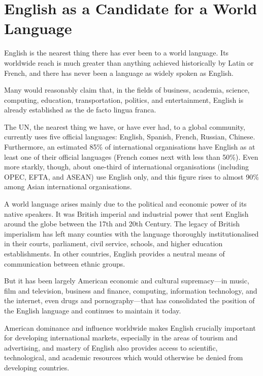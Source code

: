 \documentclass[../main.tex]{subfiles}
\begin{document}
    \section{English as a Candidate for a World Language}
        English is the nearest thing there has ever been to a world language. Its worldwide reach is much greater than anything achieved historically by Latin or French, and there has never been a language as widely spoken as English. \par 
        Many would reasonably claim that, in the fields of business, academia, science, computing, education, transportation, politics, and entertainment, English is already established as the de facto lingua franca. \par 
        The UN, the nearest thing we have, or have ever had, to a global community, currently uses five official languages: English, Spanish, French, Russian, Chinese. Furthermore, an estimated 85\% of international organisations have English as at least one of their official languages (French comes next with less than 50\%). Even more starkly, though, about one-third of international organisations (including OPEC, EFTA, and ASEAN) use English only, and this figure rises to almost 90\% among Asian international organisations.  \par 
        A world language arises mainly due to the political and economic power of its native speakers. It was British imperial and industrial power that sent English around the globe between the 17th and 20th Century. The legacy of British imperialism has left many counties with the language thoroughly institutionalised in their courts, parliament, civil service, schools, and higher education establishments. In other countries, English provides a neutral means of communication between ethnic groups. \par
        But it has been largely American economic and cultural supremacy---in music, film and television, business and finance, computing, information technology, and the internet, even drugs and pornography---that has consolidated the position of the English language and continues to maintain it today. \par 
        American dominance and influence worldwide makes English crucially important for developing international markets, especially in the areas of tourism and advertising, and mastery of English also provides access to scientific, technological, and academic resources which would otherwise be denied from developing countries. 
\end{document}
